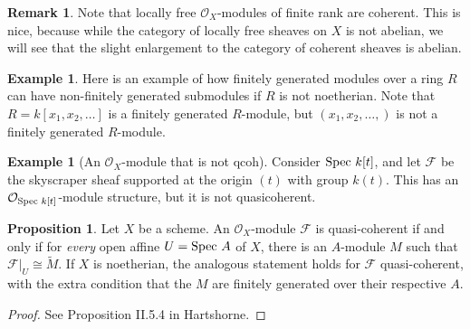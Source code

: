 \documentclass[10pt,reqno]{amsart}
\theoremstyle{definition}
\newtheorem{example}[theorem]{Example}
\newtheorem{proposition}[theorem]{Proposition}
\newtheorem{lemma}[theorem]{Lemma}
\newtheorem{remark}[theorem]{Remark}
\theoremstyle{remark}
\numberwithin{equation}{section}
\numberwithin{theorem}{section}
\newcommand{\OO}{{\mathcal O}}
\newcommand{\spec}{\textup{Spec }}
\newcommand{\FF}{{\mathscr F}}
\newcommand{\wt}{\widetilde}
\begin{document}
\begin{remark} Note that locally free $\OO_X$-modules of finite rank are coherent. This is nice, because while the category of locally free sheaves on $X$ is not abelian, we will see that the slight enlargement to the category of coherent sheaves is abelian.
\end{remark}

\begin{example}Here is an example of how finitely generated modules over a ring $R$ can have non-finitely generated submodules if $R$ is not noetherian.  Note that $R = k[x_1,x_2,\dots]$ is a finitely generated $R$-module, but $(x_1,x_2,\dots,)$ is not a finitely generated $R$-module.
\end{example}

\begin{example}[An $\OO_X$-module that is not qcoh]
Consider $\spec k[t]$, and let $\FF$ be the skyscraper sheaf supported at the origin $(t)$ with group $k(t)$. This has an $\OO_{\spec k[t]}$-module structure, but it is not quasicoherent.
\end{example}





\begin{proposition}
Let $X$ be a scheme. An $\OO_X$-module $\FF$ is quasi-coherent if and only if for \textit{every} open affine $U = \spec A$ of $X$, there is an $A$-module $M$ such that $\FF|_{U} \cong \wt{M}$. If $X$ is noetherian, the analogous statement holds for $\FF$ quasi-coherent, with the extra condition that the $M$ are finitely generated over their respective $A$.
\end{proposition}
\begin{proof}
See Proposition II.5.4 in Hartshorne.
\end{proof}
\end{document}
